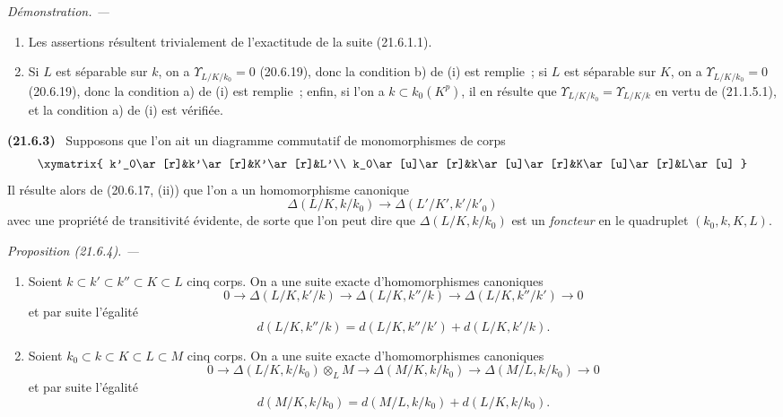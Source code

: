 \documentclass[10pt,oneside]{book}
\makeatletter
\newcommand{\setmanualcurrentlabel}[1]{\def\@currentlabel{#1}}
\newcommand{\oldpage}[2][]{%
  \setcounter{footnote}{0}%
  \marginpar{\scriptsize\textbf{#1}~|~#2}\ignorespaces}
\newenvironment{env}[1][]{\setmanualcurrentlabel{#1}\par\medskip\noindent\textbf{(#1)}\ }{\par}
\newenvironment{proposition}[1][]{%
  \setmanualcurrentlabel{#1}\par\medskip\noindent\itshape Proposition (#1). ---\ }{\par}
\newenvironment{proof}{%
  \par\medskip\noindent\textit{Démonstration. ---\ }}{\par}
\makeatother
\begin{document}
\begin{proof}
\begin{enumerate}
  \item[(i)] Les assertions résultent trivialement de l'exactitude de la suite
  (21.6.1.1).
  \item[(ii)] Si $L$ est séparable sur $k$, on a
  $\Upsilon_{L/K/k_0}=0$ (20.6.19), donc la condition b) de (i) est remplie~;
  si $L$ est séparable sur $K$, on a
  $\Upsilon_{L/K/k_0}=0$ (20.6.19), donc la condition a) de (i) est remplie~;
  enfin, si l'on a $k\subset k_0(K^p)$, il en résulte que
  $\Upsilon_{L/K/k_0}=\Upsilon_{L/K/k}$ en vertu de (21.1.5.1), et la
  condition a) de (i) est vérifiée.
\end{enumerate}
\end{proof}
\oldpage[0\textsubscript{IV-1}]{168}
\begin{env}[21.6.3]
\label{0.21.6.3-fr}
Supposons que l'on ait un diagramme commutatif de monomorphismes de corps
\[
\xymatrix{
 k'_0\ar[r]&k'\ar[r]&K'\ar[r]&L'\\
 k_0\ar[u]\ar[r]&k\ar[u]\ar[r]&K\ar[u]\ar[r]&L\ar[u]
}
\]
Il résulte alors de (20.6.17, (ii)) que l'on a un homomorphisme canonique
\begin{equation}
\tag{21.6.3.1}
\label{0.21.6.3.1-fr}
\Delta(L/K,k/k_0)\longrightarrow\Delta(L'/K',k'/k'_0)
\end{equation}
avec une propriété de transitivité évidente, de sorte que l'on peut dire que
$\Delta(L/K,k/k_0)$ est un \emph{foncteur} en le quadruplet
$(k_0,k,K,L)$.
\end{env}

\begin{proposition}[21.6.4]
\label{0.21.6.4-fr}
\begin{enumerate}
  \item[\rm (i)] Soient $k\subset k'\subset k''\subset K\subset L$ cinq corps.
  On a une suite exacte d'homomorphismes canoniques
\begin{equation}
\tag{21.6.4.1}
\label{0.21.6.4.1-fr}
0\to\Delta(L/K,k'/k)\to\Delta(L/K,k''/k)\to\Delta(L/K,k''/k')\to0
\end{equation}
et par suite l'égalité
\begin{equation}
\tag{21.6.4.2}
\label{0.21.6.4.2-fr}
d(L/K,k''/k)=d(L/K,k''/k')+d(L/K,k'/k).
\end{equation}
  \item[\rm (ii)] Soient $k_0\subset k\subset K\subset L\subset M$ cinq corps.
  On a une suite exacte d'homomorphismes canoniques
\begin{equation}
\tag{21.6.4.3}
\label{0.21.6.4.3-fr}
0\to\Delta(L/K,k/k_0)\otimes_LM\to\Delta(M/K,k/k_0)
\to\Delta(M/L,k/k_0)\to0
\end{equation}
et par suite l'égalité
\begin{equation}
\tag{21.6.4.4}
\label{0.21.6.4.4-fr}
d(M/K,k/k_0)=d(M/L,k/k_0)+d(L/K,k/k_0).
\end{equation}
\end{enumerate}
\end{proposition}
\end{document}
